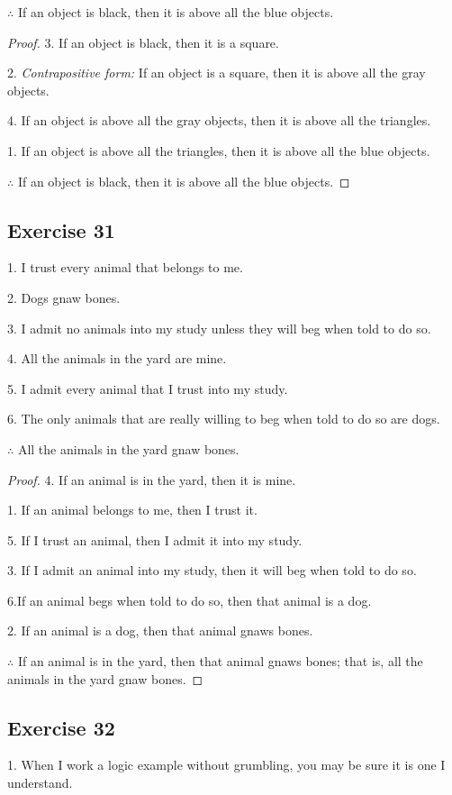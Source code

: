 \documentclass[14pt]{extarticle}
\begin{document}
$\therefore$ If an object is black, then it is above all the blue objects.

\begin{proof}
    3. If an object is black, then it is a square.

    2. {\it Contrapositive form:} If an object is a square, then it is above all the gray objects.

    4. If an object is above all the gray objects, then it is above all the triangles.

    1. If an object is above all the triangles, then it is above all the blue objects.

    $\therefore$ If an object is black, then it is above all the blue objects.
\end{proof}

\subsection{Exercise 31}
1. I trust every animal that belongs to me.

2. Dogs gnaw bones.

3. I admit no animals into my study unless they will beg when told to do so.

4. All the animals in the yard are mine.

5. I admit every animal that I trust into my study.

6. The only animals that are really willing to beg when told to do so are dogs.

$\therefore$ All the animals in the yard gnaw bones.

\begin{proof}
    4. If an animal is in the yard, then it is mine.

    1. If an animal belongs to me, then I trust it.

    5. If I trust an animal, then I admit it into my study.

    3. If I admit an animal into my study, then it will beg when told to do so.

    6.If an animal begs when told to do so, then that animal is a dog.

    2. If an animal is a dog, then that animal gnaws bones.

    $\therefore$ If an animal is in the yard, then that animal gnaws bones; that is, all the animals in the yard gnaw bones.
\end{proof}

\subsection{Exercise 32}
1. When I work a logic example without grumbling, you may be sure it is one I understand.
\end{document}
